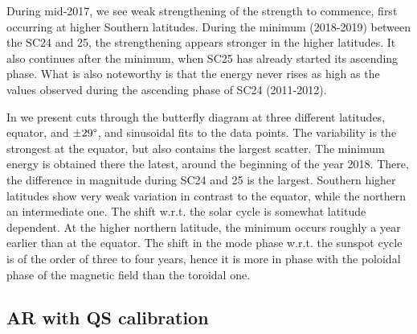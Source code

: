 \documentclass{aa}
\begin{document}
During mid-2017, we see weak strengthening of the \fff strength to commence, first occurring at higher Southern latitudes. During the minimum (2018-2019) between the SC24 and 25, the strengthening appears stronger in the higher latitudes. It also continues after the minimum, when 
SC25
has already started its ascending phase. What is also noteworthy is that the \fff
energy
never rises as high as the values observed during the ascending phase of SC24 (2011-2012).

In  we present cuts through the butterfly
diagram at three different latitudes, equator, and $\pm 29\degree$, and sinusoidal fits to the data points. The variability is the strongest at the equator, but also contains the largest scatter. The minimum \fff energy 
is obtained there 
the latest, 
around the beginning of the year 2018. There, the difference in magnitude during SC24 and 25 is the largest. Southern higher latitudes show very weak variation in contrast to the equator, 
while the northern an intermediate one. 
The shift w.r.t. the solar cycle is somewhat latitude dependent. At the higher northern latitude, the \fff minimum occurs roughly a year earlier than at the equator. The shift in the \fff mode phase w.r.t. the sunspot cycle is of the order of three to four years, hence it is more in phase with the 
poloidal phase of the magnetic field than the toroidal one.

\subsection{AR \fff with QS calibration}\label{arf}
\end{document}
